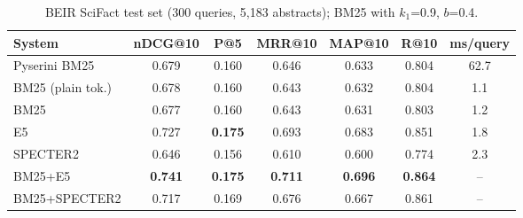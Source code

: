 \begin{table}[t]
\centering
\small
\caption{BEIR SciFact test set (300 queries, 5,183 abstracts); BM25 with $k_1$=0.9, $b$=0.4.}
\label{tab:scifact}
\begin{tabular}{lcccccc}
\toprule
System & nDCG@10 & P@5 & MRR@10 & MAP@10 & R@10 & ms/query \\
\midrule
Pyserini BM25 & 0.679 & 0.160 & 0.646 & 0.633 & 0.804 & 62.7 \\
BM25 (plain tok.) & 0.678 & 0.160 & 0.643 & 0.632 & 0.804 & 1.1 \\
BM25 & 0.677 & 0.160 & 0.643 & 0.631 & 0.803 & 1.2 \\
E5 & 0.727 & \textbf{0.175} & 0.693 & 0.683 & 0.851 & 1.8 \\
SPECTER2 & 0.646 & 0.156 & 0.610 & 0.600 & 0.774 & 2.3 \\
BM25+E5 & \textbf{0.741} & \textbf{0.175} & \textbf{0.711} & \textbf{0.696} & \textbf{0.864} & -- \\
BM25+SPECTER2 & 0.717 & 0.169 & 0.676 & 0.667 & 0.861 & -- \\
\bottomrule
\end{tabular}
\end{table}
